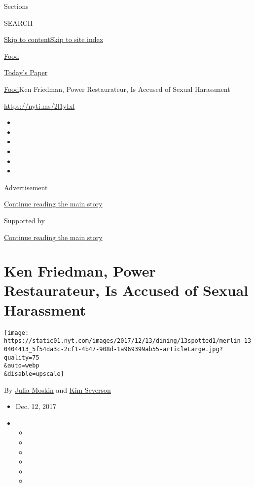 Sections

SEARCH

\protect\hyperlink{site-content}{Skip to
content}\protect\hyperlink{site-index}{Skip to site index}

\href{https://www.nytimes.com/section/food}{Food}

\href{https://myaccount.nytimes.com/auth/login?response_type=cookie\&client_id=vi}{}

\href{https://www.nytimes.com/section/todayspaper}{Today's Paper}

\href{/section/food}{Food}\textbar{}Ken Friedman, Power Restaurateur, Is
Accused of Sexual Harassment

\url{https://nyti.ms/2l1yIxl}

\begin{itemize}
\item
\item
\item
\item
\item
\item
\end{itemize}

Advertisement

\protect\hyperlink{after-top}{Continue reading the main story}

Supported by

\protect\hyperlink{after-sponsor}{Continue reading the main story}

\hypertarget{ken-friedman-power-restaurateur-is-accused-of-sexual-harassment}{%
\section{Ken Friedman, Power Restaurateur, Is Accused of Sexual
Harassment}\label{ken-friedman-power-restaurateur-is-accused-of-sexual-harassment}}

\texttt{[image: https://static01.nyt.com/images/2017/12/13/dining/13spotted1/merlin\_130404413\_5f54da3c-2cf1-4b47-908d-1a969399ab55-articleLarge.jpg?quality=75\\\&auto=webp\\\&disable=upscale]}

By \href{https://www.nytimes.com/by/julia-moskin}{Julia Moskin} and
\href{https://www.nytimes.com/by/kim-severson}{Kim Severson}

\begin{itemize}
\item
  Dec. 12, 2017
\item
  \begin{itemize}
  \item
  \item
  \item
  \item
  \item
  \item
  \end{itemize}
\end{itemize}


